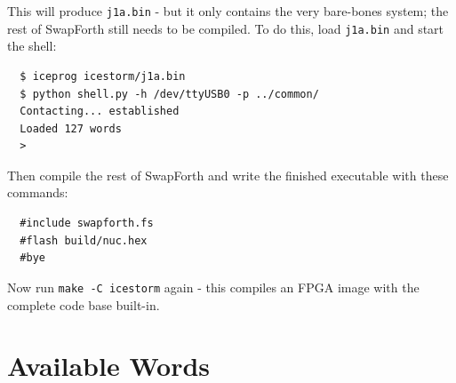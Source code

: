 \documentclass[10pt]{book}
\newcommand{\mach}[1]{\texttt{#1}}
\newcommand{\word}[1]{
\texttt{\textbf{#1}}
}
\begin{document}
\noindent
This will produce \mach{j1a.bin} - but it only contains the very bare-bones system;
the rest of SwapForth still needs to be compiled.
To do this, load \mach{j1a.bin} and start the shell:

\begin{framed}
\begin{Verbatim}
  $ iceprog icestorm/j1a.bin
  $ python shell.py -h /dev/ttyUSB0 -p ../common/
  Contacting... established
  Loaded 127 words
  >
\end{Verbatim}
\end{framed}

Then compile the rest of SwapForth and write the finished executable with these commands:

\begin{framed}
\begin{Verbatim}
  #include swapforth.fs
  #flash build/nuc.hex
  #bye
\end{Verbatim}
\end{framed}

Now run \mach{make -C icestorm} again - this compiles an FPGA image with the complete code base built-in.


\newcommand{\worddef}[3]{
\vspace{1pt}
\noindent \word{#1} \mach{#2} #3
\\
}

\newcommand{\longworddef}[3]{
\begin{samepage}
\vspace{1pt}

\noindent \word{#1}
\index{#1@\mach{#1}}

\vspace{4pt}

\mach{#2}

\vspace{4pt}

\setlength{\parindent}{0cm}

#3

\end{samepage}

\noindent
\textcolor{lightgray}{\rule{\textwidth}{1pt}}
}

\chapter{Available Words}
\end{document}
